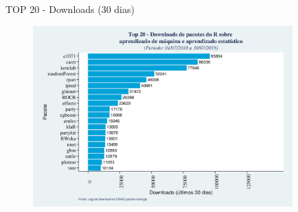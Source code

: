 \documentclass[12pt,ignorenonframetext,aspectratio=1610]{beamer}
\begin{document}
\begin{frame}[t]{TOP 20 - Downloads (30 dias)}
	
	\begin{figure}[H]
		\centering
		\includegraphics[width=10cm, height=7cm]{Fig/dwl_month.jpeg}
	\end{figure}
	
\end{frame}

	
	
\end{document}
